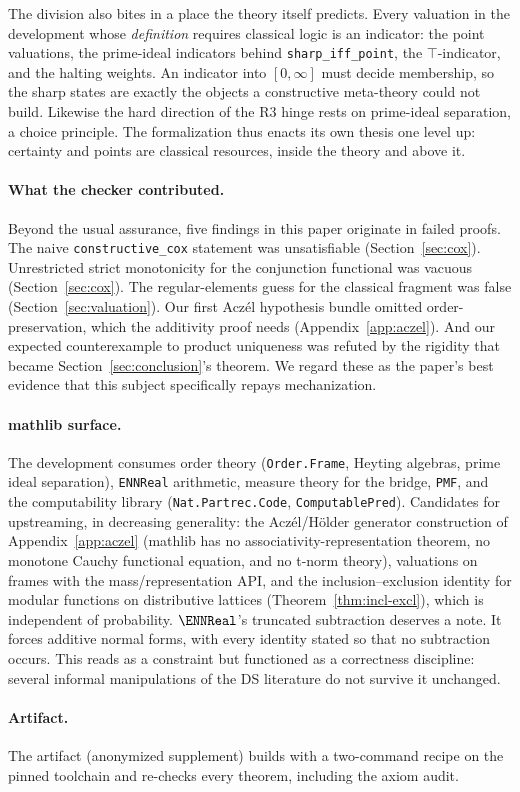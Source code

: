 The division also bites in a place the theory itself predicts.
Every valuation in the development whose \emph{definition} requires
classical logic is an indicator: the point valuations, the
prime-ideal indicators behind \texttt{sharp\_iff\_point}, the
$\top$-indicator, and the halting weights.  An indicator into
$[0,\infty]$ must decide membership, so the sharp states are exactly
the objects a constructive meta-theory could not build.  Likewise
the hard direction of the R3 hinge rests on prime-ideal separation,
a choice principle.  The formalization thus enacts its own thesis
one level up: certainty and points are classical resources, inside
the theory and above it.

\paragraph{What the checker contributed.}
Beyond the usual assurance, five findings in this paper originate in
failed proofs.  The naive \texttt{constructive\_cox} statement was
unsatisfiable (Section~\ref{sec:cox}).  Unrestricted strict
monotonicity for the conjunction functional was vacuous
(Section~\ref{sec:cox}).  The regular-elements guess for the
classical fragment was false (Section~\ref{sec:valuation}).  Our
first Acz\'el hypothesis bundle omitted order-preservation, which
the additivity proof needs (Appendix~\ref{app:aczel}).  And our
expected counterexample to product uniqueness was refuted by the
rigidity that became Section~\ref{sec:conclusion}'s theorem.  We
regard these as the paper's best evidence that this subject
specifically repays mechanization.

\paragraph{\textsf{mathlib} surface.}
The development consumes order theory
(\texttt{Order.Frame}, Heyting algebras, prime ideal separation),
\texttt{ENNReal} arithmetic, measure theory for the bridge,
\texttt{PMF}, and the computability library
(\texttt{Nat.Partrec.Code}, \texttt{ComputablePred}).  Candidates
for upstreaming, in decreasing generality: the Acz\'el/H\"older
generator construction of Appendix~\ref{app:aczel}
(\textsf{mathlib} has no associativity-representation theorem, no
monotone Cauchy functional equation, and no t-norm theory),
valuations on frames with the mass/representation API, and the
inclusion--exclusion identity for modular functions on distributive
lattices (Theorem~\ref{thm:incl-excl}), which is independent of
probability.  $\ENNReal$'s truncated subtraction deserves a note.
It forces additive normal forms, with every identity stated so that
no subtraction occurs.  This reads as a constraint but functioned as
a correctness discipline: several informal manipulations of the DS
literature do not survive it unchanged.

\paragraph{Artifact.}
The artifact (anonymized supplement) builds with a two-command
recipe on the pinned toolchain and re-checks every theorem,
including the axiom audit.
